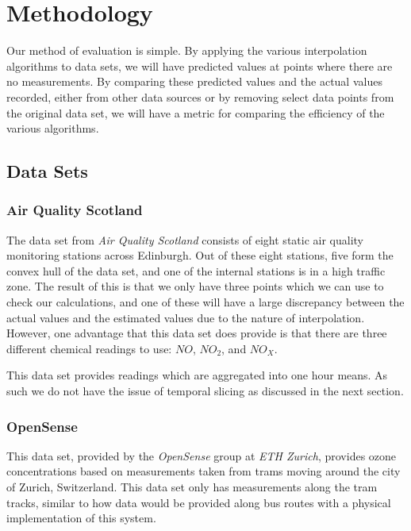	\section{Methodology}\label{prediction_evaluation_methodology}

		Our method of evaluation is simple. By applying the various interpolation algorithms to data sets, we will have predicted values at points where there are no measurements. By comparing these predicted values and the actual values recorded, either from other data sources or by removing select data points from the original data set, we will have a metric for comparing the efficiency of the various algorithms. 

		\subsection{Data Sets}\label{prediction_evaluation_methodology_data_sets}

			\subsubsection{Air Quality Scotland}\label{prediction_evaluation_methodology_data_sets_air_quality_scotland}

				The data set from \emph{Air Quality Scotland} consists of eight static air quality monitoring stations across Edinburgh. Out of these eight stations, five form the convex hull of the data set, and one of the internal stations is in a high traffic zone. The result of this is that we only have three points which we can use to check our calculations, and one of these will have a large discrepancy between the actual values and the estimated values due to the nature of interpolation. However, one advantage that this data set does provide is that there are three different chemical readings to use: $NO$, $NO_{2}$, and $NO_{X}$.

				This data set provides readings which are aggregated into one hour means. As such we do not have the issue of temporal slicing as discussed in the next section.

			\subsubsection{OpenSense}\label{prediction_evaluation_methodology_data_sets_opensense}

				This data set, provided by the \emph{OpenSense} group at \emph{ETH Zurich}, provides ozone concentrations based on measurements taken from trams moving around the city of Zurich, Switzerland. This data set only has measurements along the tram tracks, similar to how data would be provided along bus routes with a physical implementation of this system. 

